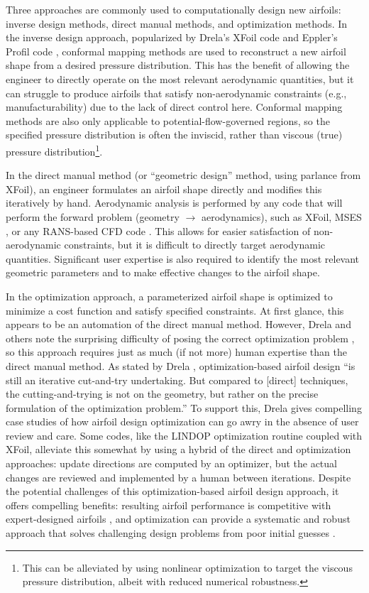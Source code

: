 \documentclass[conf]{new-aiaa}
\begin{document}
    Three approaches are commonly used to computationally design new airfoils: inverse design methods, direct manual methods, and optimization methods. In the inverse design approach, popularized by Drela's XFoil code \cite{drela_xfoil_1989} and Eppler's Profil code \cite{profil, tao_bs_thesis}, conformal mapping methods are used to reconstruct a new airfoil shape from a desired pressure distribution. This has the benefit of allowing the engineer to directly operate on the most relevant aerodynamic quantities, but it can struggle to produce airfoils that satisfy non-aerodynamic constraints (e.g., manufacturability) due to the lack of direct control here. Conformal mapping methods are also only applicable to potential-flow-governed regions, so the specified pressure distribution is often the inviscid, rather than viscous (true) pressure distribution\footnote{This can be alleviated by using nonlinear optimization to target the viscous pressure distribution, albeit with reduced numerical robustness.}.

    In the direct manual method (or ``geometric design'' method, using parlance from XFoil), an engineer formulates an airfoil shape directly and modifies this iteratively by hand. Aerodynamic analysis is performed by any code that will perform the forward problem (geometry $\rightarrow$ aerodynamics), such as XFoil, MSES \cite{mses}, or any RANS-based CFD code \cite{adler_cfd_2022}. This allows for easier satisfaction of non-aerodynamic constraints, but it is difficult to directly target aerodynamic quantities. Significant user expertise is also required to identify the most relevant geometric parameters and to make effective changes to the airfoil shape.

    In the optimization approach, a parameterized airfoil shape is optimized to minimize a cost function and satisfy specified constraints. At first glance, this appears to be an automation of the direct manual method. However, Drela and others note the surprising difficulty of posing the correct optimization problem \cite{drela_pros_1998, kroo_multidisciplinary_1997}, so this approach requires just as much (if not more) human expertise than the direct manual method. As stated by Drela \cite{drela_pros_1998}, optimization-based airfoil design ``is still an iterative cut-and-try undertaking. But compared to [direct] techniques, the cutting-and-trying is not on the geometry, but rather on the precise formulation of the optimization problem.'' To support this, Drela gives compelling case studies of how airfoil design optimization can go awry in the absence of user review and care. Some codes, like the LINDOP \cite{mses} optimization routine coupled with XFoil, alleviate this somewhat by using a hybrid of the direct and optimization approaches: update directions are computed by an optimizer, but the actual changes are reviewed and implemented by a human between iterations. Despite the potential challenges of this optimization-based airfoil design approach, it offers compelling benefits: resulting airfoil performance is competitive with expert-designed airfoils \cite{drela_pros_1998}, and optimization can provide a systematic and robust approach that solves challenging design problems from poor initial guesses \cite{he2019robust}.
\end{document}
